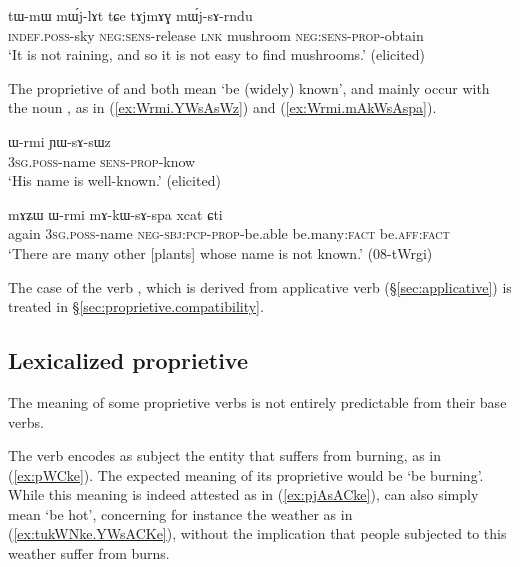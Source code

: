 \begin{exe}
\ex \label{ex:tAjmAG.mWjsArndu}
\gll tɯ-mɯ mɯ́j-lɤt tɕe tɤjmɤɣ mɯ́j-sɤ-rndu \\
\textsc{indef}.\textsc{poss}-sky \textsc{neg}:\textsc{sens}-release \textsc{lnk} mushroom \textsc{neg}:\textsc{sens}-\textsc{prop}-obtain \\
\glt `It is not raining, and so it is not easy to find mushrooms.' (elicited)
\end{exe}

The proprietive of  and  both mean `be (widely) known', and mainly occur with the noun , as in (\ref{ex:Wrmi.YWsAsWz}) and (\ref{ex:Wrmi.mAkWsAspa}).

\begin{exe}
\ex \label{ex:Wrmi.YWsAsWz}
\gll ɯ-rmi ɲɯ-sɤ-sɯz \\
\textsc{3sg}.\textsc{poss}-name \textsc{sens}-\textsc{prop}-know \\
\glt `His name is well-known.' (elicited)
\end{exe}

\begin{exe}
\ex \label{ex:Wrmi.mAkWsAspa}
\gll mɤʑɯ ɯ-rmi mɤ-kɯ-sɤ-spa xcat ɕti \\
again \textsc{3sg}.\textsc{poss}-name \textsc{neg}-\textsc{sbj}:\textsc{pcp}-\textsc{prop}-be.able be.many:\textsc{fact} be.\textsc{aff}:\textsc{fact} \\
\glt `There are many other [plants] whose name is not known.' (08-tWrgi) 
\end{exe}
 
The case of the verb , which is derived from applicative verb  (§\ref{sec:applicative}) is treated in §\ref{sec:proprietive.compatibility}.
  

\subsection{Lexicalized proprietive} \label{sec:proprietive.lexicalized}
The meaning of some proprietive verbs is not entirely predictable from their base verbs. 

The verb  encodes as subject the entity that suffers from burning, as in (\ref{ex:pWCke}). The expected meaning of its proprietive  would be `be burning'. While this meaning is indeed attested as in (\ref{ex:pjAsACke}),  can also simply mean `be hot', concerning for instance the weather as in (\ref{ex:tukWNke.YWsACKe}), without the implication that people subjected to this weather suffer from burns.

